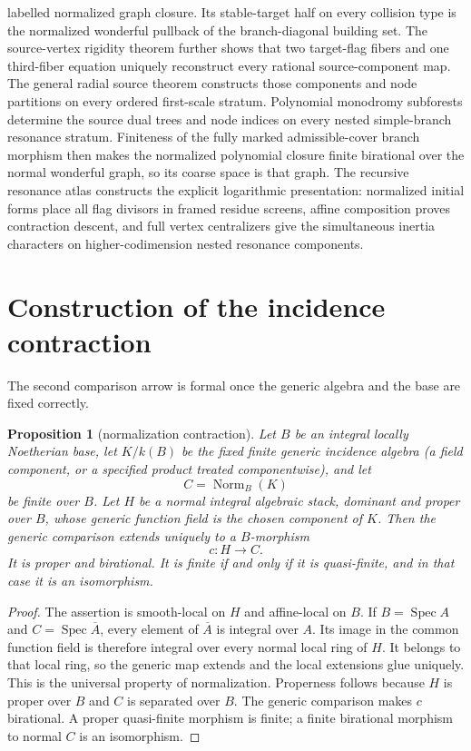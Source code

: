 \documentclass[11pt]{article}
\newtheorem{proposition}[theorem]{Proposition}
\newcommand{\Norm}{\operatorname{Norm}}
\newcommand{\Spec}{\operatorname{Spec}}
\begin{document}
labelled normalized graph closure.  Its stable-target half on every
collision type is the normalized wonderful pullback of the branch-diagonal
building set.  The source-vertex rigidity theorem further shows that two
target-flag fibers and one third-fiber equation uniquely reconstruct every
rational source-component map.  The general radial source theorem constructs
those components and node partitions on every ordered first-scale stratum.
Polynomial monodromy subforests determine the source dual trees and node
indices on every nested simple-branch resonance stratum.  Finiteness of the
fully marked admissible-cover branch morphism then makes the normalized
polynomial closure finite birational over the normal wonderful graph, so its
coarse space is that graph.  The recursive resonance atlas constructs the
explicit logarithmic presentation: normalized initial forms place all flag
divisors in framed residue screens, affine composition proves contraction
descent, and full vertex centralizers give the simultaneous inertia
characters on higher-codimension nested resonance components.

\section{Construction of the incidence contraction}

The second comparison arrow is formal once the generic algebra and the base
are fixed correctly.

\begin{proposition}[normalization contraction]\label{prop:contraction}
Let $B$ be an integral locally Noetherian base, let $K/k(B)$ be the fixed
finite generic incidence algebra (a field component, or a specified product
treated componentwise), and let
\[
 C=\Norm_B(K)
\]
be finite over $B$.  Let $H$ be a normal integral algebraic stack, dominant
and proper over $B$, whose generic function field is the chosen component of
$K$.  Then the generic comparison extends uniquely to a $B$-morphism
\[
 c:H\longrightarrow C.                              \tag{4.1}
\]
It is proper and birational.  It is finite if and only if it is
quasi-finite, and in that case it is an isomorphism.
\end{proposition}

\begin{proof}
The assertion is smooth-local on $H$ and affine-local on $B$.  If
$B=\Spec A$ and $C=\Spec\overline A$, every element of $\overline A$ is
integral over $A$.  Its image in the common function field is therefore
integral over every normal local ring of $H$.  It belongs to that local ring,
so the generic map extends and the local extensions glue uniquely.  This is
the universal property of normalization.  Properness follows because $H$ is
proper over $B$ and $C$ is separated over $B$.  The generic comparison makes
$c$ birational.  A proper quasi-finite morphism is finite; a finite
birational morphism to normal $C$ is an isomorphism.
\end{proof}
\end{document}
